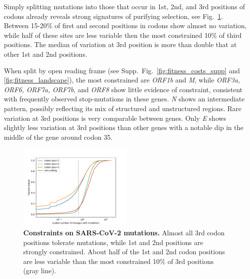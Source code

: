 \documentclass[aps,rmp, twocolumn]{revtex4}
\begin{document}
Simply splitting mutations into those that occur in 1st, 2nd, and 3rd positions of codons already reveals strong signatures of purifying selection, see Fig.~\ref{fig:fitness_costs}.
Between 15-20\% of first and second positions in codons show almost no variation, while half of these sites are less variable then the most constrained 10\% of third positions.
The median of variation at 3rd position is more than double that at other 1st and 2nd positions.

When split by open reading frame (see Supp.~Fig.~\ref{fig:fitness_costs_supp} and \ref{fig:fitness_landscape}), the most constrained are \emph{ORF1b} and \emph{M}, while \emph{ORF3a, ORF6, ORF7a, ORF7b}, and \emph{ORF8} show little evidence of constraint, consistent with frequently observed stop-mutations in these genes.
\emph{N} shows an intermediate pattern, possibly reflecting its mix of structured and unstructured regions.
Rare variation at 3rd positions is very comparable between genes.
Only \emph{E} shows slightly less variation at 3rd positions than other genes with a notable dip in the middle of the gene around codon 35.



\begin{figure}
    \includegraphics[width=0.5\textwidth]{figures/fitness_cost.pdf}
    \caption{{\bf Constraints on SARS-CoV-2 mutations.}
    Almost all 3rd codon positions tolerate mutations, while 1st and 2nd positions are strongly constrained.
    About half of the 1st and 2nd codon positions are less variable than the most constrained 10\% of 3rd positions (gray line).
    \label{fig:fitness_costs}}
 \end{figure}
\end{document}
